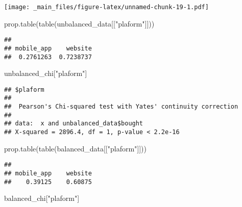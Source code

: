 \documentclass[
]{book}
\newenvironment{Shaded}{\begin{snugshade}}{\end{snugshade}}
\newcommand{\FunctionTok}[1]{\textcolor[rgb]{0.00,0.00,0.00}{#1}}
\newcommand{\NormalTok}[1]{#1}
\newcommand{\SpecialCharTok}[1]{\textcolor[rgb]{0.00,0.00,0.00}{#1}}
\newcommand{\StringTok}[1]{\textcolor[rgb]{0.31,0.60,0.02}{#1}}
\begin{document}
\texttt{[image: \_main\_files/figure-latex/unnamed-chunk-19-1.pdf]}

\begin{Shaded}
\begin{Highlighting}[]
\FunctionTok{prop.table}\NormalTok{(}\FunctionTok{table}\NormalTok{(unbalanced\_data[[}\StringTok{"plaform"}\NormalTok{]]))}
\end{Highlighting}
\end{Shaded}

\begin{verbatim}
## 
## mobile_app    website 
##  0.2761263  0.7238737
\end{verbatim}

\begin{Shaded}
\begin{Highlighting}[]
\NormalTok{unbalanced\_chi[}\StringTok{"plaform"}\NormalTok{]}
\end{Highlighting}
\end{Shaded}

\begin{verbatim}
## $plaform
## 
##  Pearson's Chi-squared test with Yates' continuity correction
## 
## data:  x and unbalanced_data$bought
## X-squared = 2896.4, df = 1, p-value < 2.2e-16
\end{verbatim}

\begin{Shaded}
\end{Shaded}

\begin{Shaded}
\begin{Highlighting}[]
\FunctionTok{prop.table}\NormalTok{(}\FunctionTok{table}\NormalTok{(balanced\_data[[}\StringTok{"plaform"}\NormalTok{]]))}
\end{Highlighting}
\end{Shaded}

\begin{verbatim}
## 
## mobile_app    website 
##    0.39125    0.60875
\end{verbatim}

\begin{Shaded}
\begin{Highlighting}[]
\NormalTok{balanced\_chi[}\StringTok{"plaform"}\NormalTok{]}
\end{Highlighting}
\end{Shaded}
\end{document}
